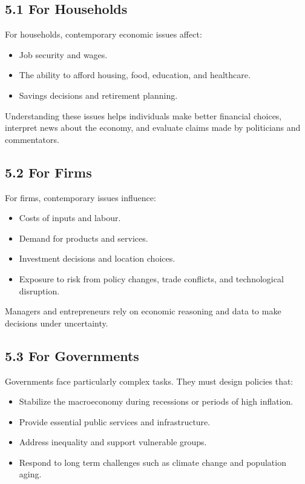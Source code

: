 \documentclass[12pt]{article}
\begin{document}
\subsection*{5.1 For Households}

For households, contemporary economic issues affect:

\begin{itemize}[noitemsep]
    \item Job security and wages.
    \item The ability to afford housing, food, education, and healthcare.
    \item Savings decisions and retirement planning.
\end{itemize}

Understanding these issues helps individuals make better financial choices, interpret news about the economy, and evaluate claims made by politicians and commentators.

\subsection*{5.2 For Firms}

For firms, contemporary issues influence:

\begin{itemize}[noitemsep]
    \item Costs of inputs and labour.
    \item Demand for products and services.
    \item Investment decisions and location choices.
    \item Exposure to risk from policy changes, trade conflicts, and technological disruption.
\end{itemize}

Managers and entrepreneurs rely on economic reasoning and data to make decisions under uncertainty.

\subsection*{5.3 For Governments}

Governments face particularly complex tasks. They must design policies that:

\begin{itemize}[noitemsep]
    \item Stabilize the macroeconomy during recessions or periods of high inflation.
    \item Provide essential public services and infrastructure.
    \item Address inequality and support vulnerable groups.
    \item Respond to long term challenges such as climate change and population aging.
\end{itemize}
\end{document}
